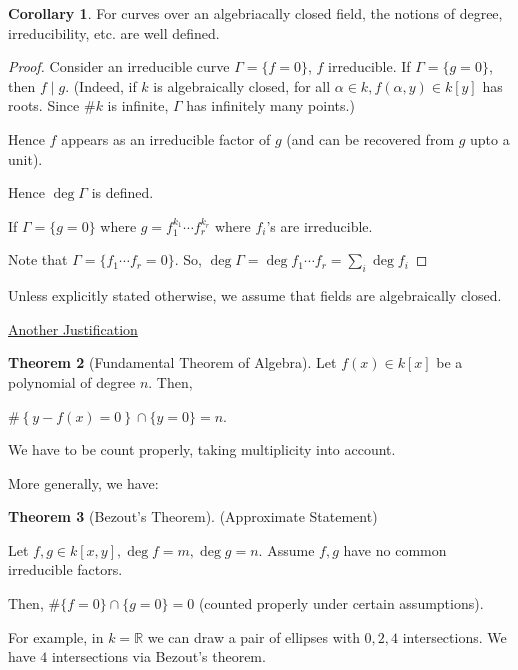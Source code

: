 \documentclass{article}
\theoremstyle{definition}
\newtheorem{theorem}{Theorem}
\newtheorem{corollary}[theorem]{Corollary}
\begin{document}
    \begin{corollary}
        For curves over an algebriacally closed field, the notions of degree, irreducibility, etc. are well defined.
    \end{corollary}

    \begin{proof}
        Consider an irreducible curve \(\Gamma = \{ f = 0 \}\), \(f\) irreducible. If \(\Gamma = \{ g = 0 \}\), then \(f\mid g\). (Indeed, if \(k\) is algebraically closed, for all \(\alpha \in k, f(\alpha,y)\in k[y]\) has roots. Since \(\#k\) is infinite, \(\Gamma\) has infinitely many points.)
        
        Hence \(f\) appears as an irreducible factor of \(g\) (and can be recovered from \(g\) upto a unit).

        Hence \(\deg \Gamma\) is defined.

        If \(\Gamma = \{ g=0 \}\) where \(g = f_1^{k_1}\cdots f_r^{k_r}\) where \(f_i\)'s are irreducible.

        Note that \(\Gamma = \{ f_1 \cdots f_r = 0 \} \). So, \(\deg \Gamma = \deg f_1 \cdots f_r = \sum_{i} \deg f_i\) 
        
    \end{proof}

    Unless explicitly stated otherwise, we assume that fields are algebraically closed.

    \underline{Another Justification}

    \begin{theorem}
        [Fundamental Theorem of Algebra] Let \(f(x)\in k[x]\) be a polynomial of degree \(n\). Then,

        \(\# \left\{ y - f(x) = 0 \right\} \cap \{ y=0 \} = n\).

        We have to be count properly, taking multiplicity into account.
    \end{theorem}

    More generally, we have:

    \begin{theorem}
        [Bezout's Theorem] (Approximate Statement)
        
        Let \(f,g\in k[x,y], \deg f = m, \deg g = n\). Assume \(f,g\) have no common irreducible factors.

        Then, \(\#\{ f=0 \} \cap \{ g=0 \} =0\) (counted properly under certain assumptions).
        
        For example, in \(k=\mathbb{R}\) we can draw a pair of ellipses with \(0,2,4\) intersections. We have \(4\) intersections via Bezout's theorem.

    \end{theorem}
\end{document}
